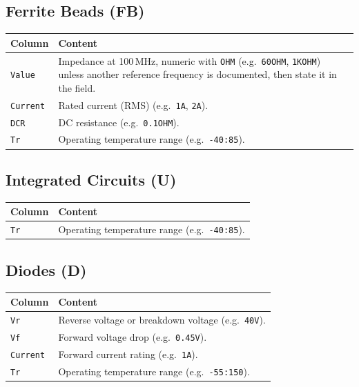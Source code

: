 \documentclass[11pt,a4paper]{article}
\begin{document}
\subsection{Ferrite Beads (FB)}

\begin{tabular}{@{}lL{9cm}@{}}
\toprule
Column & Content \\
\midrule
\texttt{Value}     & Impedance at 100\,MHz, numeric with \texttt{OHM} (e.g.\ \texttt{60OHM}, \texttt{1KOHM}) unless another reference frequency is documented, then state it in the field. \\
\texttt{Current}   & Rated current (RMS) (e.g.\ \texttt{1A}, \texttt{2A}). \\
\texttt{DCR}       & DC resistance (e.g.\ \texttt{0.1OHM}). \\
\texttt{Tr}        & Operating temperature range (e.g.\ \texttt{-40:85}). \\
\bottomrule
\end{tabular}

\subsection{Integrated Circuits (U)}

\begin{tabular}{@{}lL{9cm}@{}}
\toprule
Column & Content \\
\midrule
\texttt{Tr}        & Operating temperature range (e.g.\ \texttt{-40:85}). \\
\bottomrule
\end{tabular}

\subsection{Diodes (D)}

\begin{tabular}{@{}lL{9cm}@{}}
\toprule
Column & Content \\
\midrule
\texttt{Vr}        & Reverse voltage or breakdown voltage (e.g.\ \texttt{40V}). \\
\texttt{Vf}        & Forward voltage drop (e.g.\ \texttt{0.45V}). \\
\texttt{Current}   & Forward current rating (e.g.\ \texttt{1A}). \\
\texttt{Tr}        & Operating temperature range (e.g.\ \texttt{-55:150}). \\
\bottomrule
\end{tabular}
\end{document}
